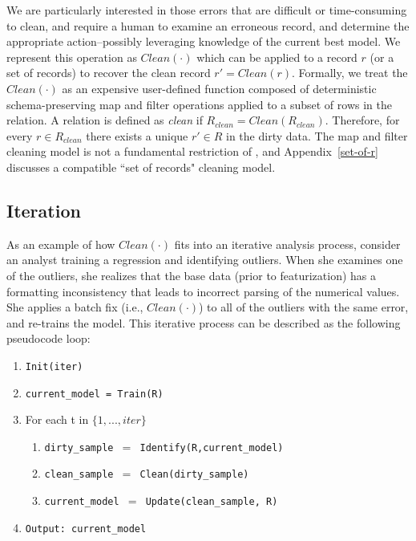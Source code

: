 We are particularly interested in those errors that are difficult or time-consuming to clean, and require a human to examine an erroneous record, and determine the appropriate action--possibly leveraging knowledge of the current best model.
We represent this operation as $Clean(\cdot)$ which can be applied to a record $r$ (or a set of records) to recover the clean record $r' = Clean(r)$.
Formally, we treat the $Clean(\cdot)$ as an expensive user-defined function composed of deterministic schema-preserving \textsf{map} and \textsf{filter} operations applied to a subset of rows in the relation.
A relation is defined as \emph{clean} if $R_{clean} = Clean(R_{clean})$.
Therefore, for every $r \in R_{clean}$ there exists a unique $r' \in R$ in the dirty data.
The \textsf{map} and \textsf{filter} cleaning model is not a fundamental restriction of \sys, and Appendix~\ref{set-of-r} discusses a compatible ``set of records" cleaning model.

\subsection{Iteration}
As an example of how $Clean(\cdot)$ fits into an iterative analysis process, consider an analyst training a regression and identifying outliers. 
When she examines one of the outliers, she realizes that the base data (prior to featurization) has a formatting inconsistency that leads to incorrect parsing of the numerical values.
She applies a batch fix (i.e., $Clean(\cdot)$) to all of the outliers with the same error, and re-trains the model. 
This iterative process can be described as the following pseudocode loop:
\begin{enumerate}[leftmargin=1em]\scriptsize\sloppy
  \item \texttt{Init(iter)}
  \item \texttt{current\_model = Train(R)}
  \item For each t in $\{1,...,iter\}$
  \begin{enumerate}
    \item \texttt{dirty\_sample $=$ Identify(R,current\_model)}
    \item \texttt{clean\_sample $=$ Clean(dirty\_sample)}
    \item \texttt{current\_model $=$ Update(clean\_sample, R)}
  \end{enumerate}
  \item \texttt{Output: current\_model}
  \end{enumerate}

